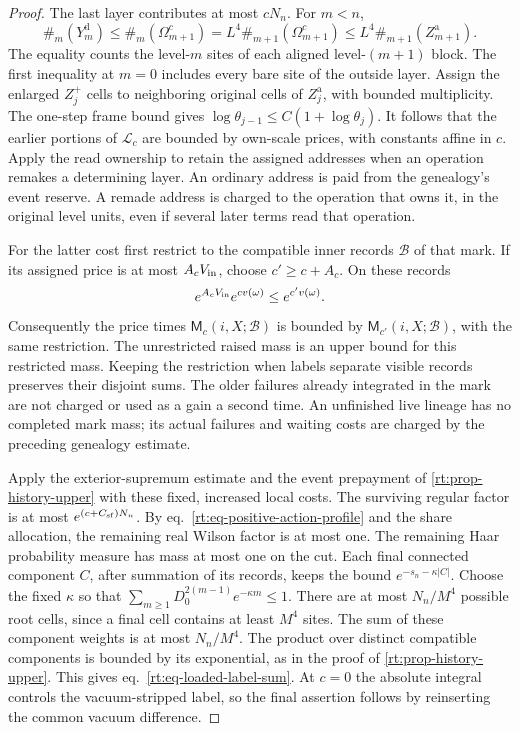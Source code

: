 \documentclass[11pt,letterpaper,reqno]{amsart}
\numberwithin{equation}{section}
\renewcommand{\eqref}[1]{\textup{eq.~\ref{#1}}}
\theoremstyle{definition}
\theoremstyle{remark}
\begin{document}
\begin{proof}
The last layer contributes at most \(cN_n\). For \(m<n\),
\[
 \#_m(Y_m^{\mathrm d})\le\#_m(\Omega_{m+1}^c)
      =L^4\#_{m+1}(\Omega_{m+1}^c)
      \le L^4\#_{m+1}(Z_{m+1}^{\mathrm a}).
\]
The equality counts the level-\(m\) sites of each aligned
level-\((m+1)\) block. The first inequality at \(m=0\)
includes every bare site of the outside layer. Assign
the enlarged \(Z_j^+\) cells to neighboring original
cells of \(Z_j^{\mathrm a}\), with bounded multiplicity.
The one-step frame bound gives
\(\log\theta_{j-1}\le C(1+\log\theta_j)\).
It follows that the earlier portions of \(\mathscr L_c\)
are bounded by own-scale prices, with constants affine in
\(c\). Apply the read ownership to retain the assigned
addresses when an operation remakes a determining layer.
An ordinary address is paid from the genealogy's event
reserve. A remade address is charged to the operation that
owns it, in the original level units, even if several later
terms read that operation.

For the latter cost first restrict to the compatible
inner records \(\mathcal B\) of that mark. If its assigned
price is at most \(A_c V_{\rm in}\), choose \(c'\ge c+A_c\).
On these records
\[
    e^{A_cV_{\rm in}}e^{c v(\omega)}
                          \le e^{c' v(\omega)} .
\]
Consequently the price times \(\mathsf M_c(i,X;\mathcal B)\)
is bounded by \(\mathsf M_{c'}(i,X;\mathcal B)\), with the
same restriction. The unrestricted raised mass is an upper
bound for this restricted mass. Keeping the restriction when
labels separate visible records preserves their disjoint sums.
The older failures already integrated in the mark are not
charged or used as a gain a second time. An unfinished live
lineage has no completed mark mass; its actual failures and waiting
costs are charged by the preceding genealogy estimate.

Apply the exterior-supremum estimate and the event prepayment
of \cref{rt:prop-history-upper} with these fixed, increased
local costs. The surviving regular factor is at most
\(e^{(c+C_{\rm sf})N_n}\). By
\eqref{rt:eq-positive-action-profile} and the share allocation,
the remaining real Wilson factor is at most one. The remaining Haar probability
measure has mass at most one on the cut. Each final connected
component \(C\), after summation of its records, keeps the
bound \(e^{-s_n-\kappa |C|}\). Choose the fixed \(\kappa\)
so that \(\sum_{m\ge1}D_0^{2(m-1)}e^{-\kappa m}\le1\).
There are at most \(N_n/M^4\) possible root cells, since a
final cell contains at least \(M^4\) sites. The sum of these
component weights is at most \(N_n/M^4\). The product over
distinct compatible components is bounded by its exponential,
as in the proof of \cref{rt:prop-history-upper}. This gives
\eqref{rt:eq-loaded-label-sum}. At $c=0$ the
absolute integral controls the vacuum-stripped label, so
the final assertion follows by reinserting the common
vacuum difference.
\end{proof}
\end{document}
